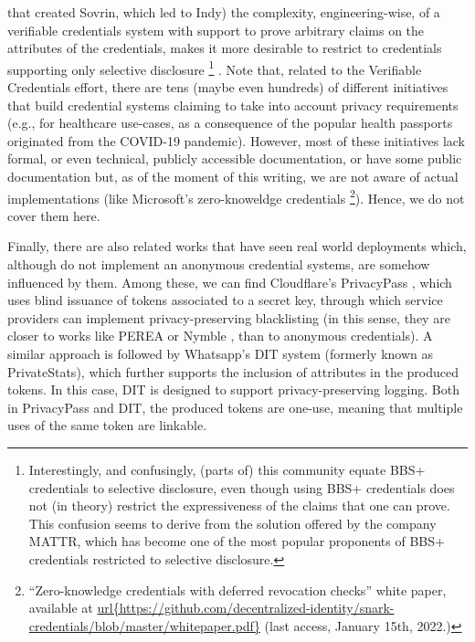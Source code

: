 that created Sovrin, which led to Indy) the complexity, engineering-wise, of a
verifiable credentials system with support to prove arbitrary claims on the
attributes of the credentials, makes it more desirable to restrict to
credentials supporting only selective disclosure%
\footnote{Interestingly, and confusingly, (parts of) this community equate BBS+
  credentials to selective disclosure, even though using BBS+ credentials does
  not (in theory) restrict the expressiveness of the claims that one can prove.
  This confusion seems to derive from the solution offered by the company MATTR,
  which has become one of the most popular proponents of BBS+ credentials
  restricted to selective disclosure.}
. Note that, related to the Verifiable Credentials effort, there are tens (maybe
even hundreds) of different initiatives that build credential systems claiming
to take into account privacy requirements (e.g., for healthcare use-cases, as a
consequence of the popular health passports originated from the COVID-19
pandemic). However, most of these initiatives lack formal, or even technical,
publicly accessible documentation, or have some public documentation but, as
of the moment of this writing, we are not aware of actual implementations
(like Microsoft's zero-knoweldge credentials%
\footnote{``Zero-knowledge credentials with deferred revocation checks'' white
  paper, available at \url{url{https://github.com/decentralized-identity/snark-credentials/blob/master/whitepaper.pdf}}
  (last access, January 15th, 2022.)}). Hence, we do not cover them here. 

Finally, there are also related works that have seen real world deployments
which, although do not implement an anonymous credential systems, are somehow
influenced by them. Among these, we can find Cloudflare's PrivacyPass \cite{dgs+18},
which uses blind issuance of tokens associated to a secret key, through which
service providers can implement privacy-preserving blacklisting (in this sense,
they are closer to works like PEREA \cite{atk11} or Nymble \cite{tkcs11}, than
to anonymous credentials). A similar approach is followed by Whatsapp's DIT
system \cite{hij+21} (formerly known as PrivateStats), which further supports
the inclusion of attributes in the produced tokens. In this case, DIT is
designed to support privacy-preserving logging. Both in PrivacyPass and DIT, the
produced tokens are one-use, meaning that multiple uses of the same token are
linkable.

